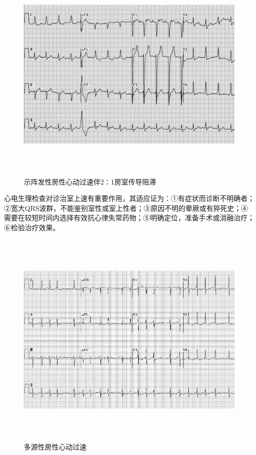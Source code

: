 \begin{figure}[!htbp]
 \centering
 \includegraphics[width=6.29167in,height=4.19792in]{./images/Image00414.jpg}
 \captionsetup{justification=centering}
 \caption{示阵发性房性心动过速伴2∶1房室传导阻滞}
 \label{fig102-3}
  \end{figure} 

心电生理检查对诊治室上速有重要作用，其适应证为：①有症状而诊断不明确者；②宽大QRS波群，不能鉴别室性或室上性者；③原因不明的晕厥或有猝死史；④需要在较短时间内选择有效抗心律失常药物；⑤明确定位，准备手术或消融治疗；⑥检验治疗效果。

\begin{figure}[!htbp]
 \centering
 \includegraphics[width=6.29167in,height=4.19792in]{./images/Image00415.jpg}
 \captionsetup{justification=centering}
 \caption{多源性房性心动过速}
 \label{fig102-4}
  \end{figure} 

